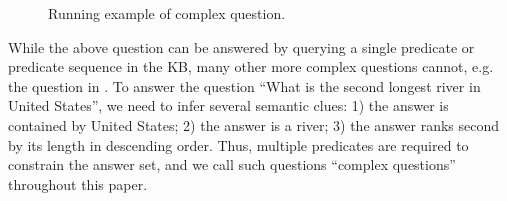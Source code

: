 \begin{figure}[th]
	\centering
	\caption{Running example of complex question.}
	\label{fig:intro}
\end{figure}

While the above question can be answered by querying
a single predicate or predicate sequence in
the KB, many other more complex questions cannot, e.g. the question
in .
To answer the question ``What is the second longest river in United States'',
we need to infer several semantic clues:
1) the answer is contained by United States;
2) the answer is a river;
3) the answer ranks second by its length in descending order.
Thus, multiple predicates are required to constrain the answer set,
and we call such questions ``complex questions'' throughout this paper.



%
%
%



